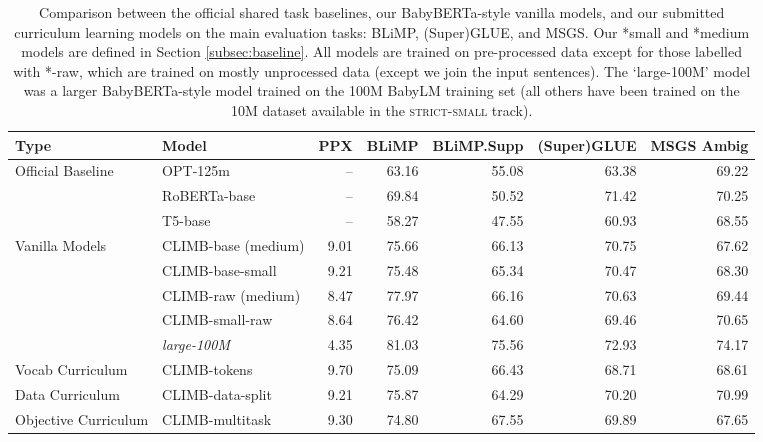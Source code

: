 \begin{table}
\centering
\small
\begin{tabular}{llrrrrr}
\toprule
Type              & Model    & PPX   & BLiMP & BLiMP.Supp & (Super)GLUE & MSGS Ambig \\
\midrule
Official Baseline & OPT-125m         & --    &   63.16 & 55.08 & 63.38 & 69.22 \\
                  & RoBERTa-base      & --  &   
                69.84 & 50.52 & 71.42 & 70.25 \\
                  & T5-base         & --    &   58.27 & 47.55  & 60.93 & 68.55 \\
\midrule
Vanilla Models    &CLIMB-base (medium)   & 9.01   & 75.66 & 66.13 & 70.75 & 67.62 \\
                  & CLIMB-base-small & 9.21  & 75.48 & 65.34 & 70.47 & 68.30 \\
                  & CLIMB-raw (medium)   &  8.47   & 77.97 & 66.16 & 70.63 & 69.44 \\
                  & CLIMB-small-raw  & 8.64  & 76.42 & 64.60 & 69.46 & 70.65 \\
                & \emph{large-100M}      & 4.35      &   81.03 & 75.56 & 72.93 & 74.17 \\
\midrule
Vocab Curriculum          & CLIMB-tokens   &  9.70  & 75.09 & 66.43  & 68.71 & 68.61 \\
Data Curriculum           & CLIMB-data-split & 9.21 & 75.87 & 64.29  & 70.20 & 70.99 \\
Objective Curriculum      & CLIMB-multitask & 9.30 & 74.80 & 67.55  & 69.89 & 67.65 \\
\bottomrule
\end{tabular}
\caption{\label{tbl:submission-comparison} Comparison between the official shared task baselines, our BabyBERTa-style vanilla models, and our submitted curriculum learning models on the main evaluation tasks: BLiMP, (Super)GLUE, and MSGS. Our *small and *medium models are defined in Section \ref{subsec:baseline}. All models are trained on pre-processed data except for those labelled with *-raw, which are trained on mostly unprocessed data (except we join the input sentences). The `large-100M' model was a larger BabyBERTa-style model trained on the 100M BabyLM training set (all others have been trained on the 10M dataset available in the \textsc{strict-small} track). }
\end{table}

